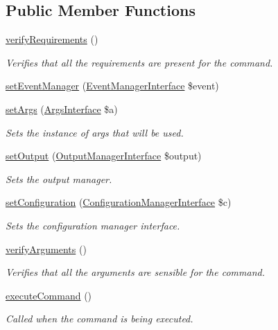 \subsection*{Public Member Functions}
\begin{DoxyCompactItemize}
\item 
\hyperlink{classGenericSiteCommand_a984e5d6fa123e9443f14d99a7919e85d}{verify\-Requirements} ()
\begin{DoxyCompactList}\small\item\em Verifies that all the requirements are present for the command. \end{DoxyCompactList}\item 
\hyperlink{classGenericCommand_acba0758cce439b8aeaff359578ba5d1d}{set\-Event\-Manager} (\hyperlink{interfaceEventManagerInterface}{Event\-Manager\-Interface} \$event)
\item 
\hyperlink{classGenericCommand_ab918b084bc099cb5f8f56db2d6ed4cac}{set\-Args} (\hyperlink{interfaceArgsInterface}{Args\-Interface} \$a)
\begin{DoxyCompactList}\small\item\em Sets the instance of args that will be used. \end{DoxyCompactList}\item 
\hyperlink{classGenericCommand_aee43238a646b83c341ccb27b7d8e0978}{set\-Output} (\hyperlink{interfaceOutputManagerInterface}{Output\-Manager\-Interface} \$output)
\begin{DoxyCompactList}\small\item\em Sets the output manager. \end{DoxyCompactList}\item 
\hyperlink{classGenericCommand_a3677ddac20e11f61766c56820f74555b}{set\-Configuration} (\hyperlink{interfaceConfigurationManagerInterface}{Configuration\-Manager\-Interface} \$c)
\begin{DoxyCompactList}\small\item\em Sets the configuration manager interface. \end{DoxyCompactList}\item 
\hyperlink{classGenericCommand_a3ceec8b56361aeb4b09bee46bb85bac4}{verify\-Arguments} ()
\begin{DoxyCompactList}\small\item\em Verifies that all the arguments are sensible for the command. \end{DoxyCompactList}\item 
\hyperlink{interfaceRouterCommand_ab0eb6b733558c299ebe69e8b0199e9f6}{execute\-Command} ()
\begin{DoxyCompactList}\small\item\em Called when the command is being executed. \end{DoxyCompactList}\end{DoxyCompactItemize}

